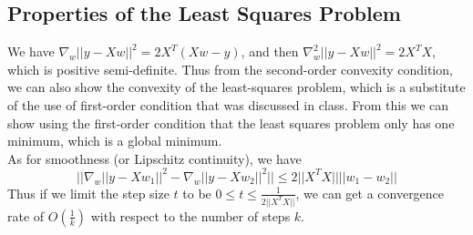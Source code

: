 \documentclass[11pt]{article}
\begin{document}
\subsection{Properties of the Least Squares Problem}
We have $\nabla_w ||y-Xw||^2 = 2X^{T}(Xw-y)$, and then $\nabla^2_w ||y-Xw||^2 = 2X^{T}X$, which is positive semi-definite. Thus from the second-order convexity condition, we can also show the convexity of the least-squares problem, which is a substitute of the use of first-order condition that was discussed in class. From this we can show using the first-order condition that the least squares problem only has one minimum, which is a global minimum.\\

As for smoothness (or Lipschitz continuity), we have $$||\nabla_w ||y-Xw_1||^2 - \nabla_w ||y-Xw_2||^2|| \leq 2||X^{T}X|| ||w_1 - w_2||$$
Thus if we limit the step size $t$ to be $0 \leq t \leq \frac{1}{2||X^{T}X||}$, we can get a convergence rate of $O(\frac{1}{k})$ with respect to the number of steps $k$.







\end{document}
